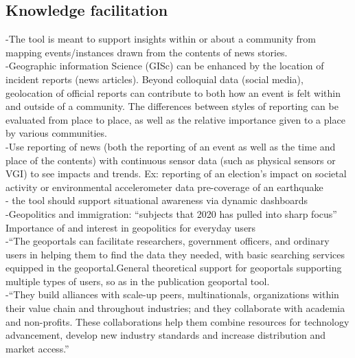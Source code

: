\subsection{Knowledge facilitation}
-{\color{purple}The tool is meant to support insights within or about a community from mapping events/instances drawn from the contents of news stories.\cite{McQueenBaker2019}}\\
-{\color{purple}Geographic information Science (GISc) can be enhanced by the location of incident reports (news articles).  Beyond colloquial data (social media), geolocation of official reports can contribute to both how an event is felt within and outside of a community. The differences between styles of reporting can be evaluated from place to place, as well as the relative importance given to a place by various communities.\cite{Datta2018}}\\
-{\color{purple}Use reporting of news (both the reporting of an event as well as the time and place of the contents) with continuous sensor data (such as physical sensors or VGI) to see impacts and trends. Ex: reporting of an election’s impact on societal activity or environmental accelerometer data pre-coverage of an earthquake}\cite{Bhattacharya2018}\\
-{\color{purple} the tool should support situational awareness via dynamic dashboards \cite{Varanda2020}}\\
-{\color{orange}Geopolitics and immigration: “subjects that 2020 has pulled into sharp focus” Importance of and interest in geopolitics for everyday users \cite{Granger2020a}}\\
-{\color{orange}“The geoportals can facilitate researchers, government officers, and ordinary users in helping them to find the data they needed, with basic searching services equipped in the geoportal.\cite{Jian2020}}{\color{purple}General theoretical support for geoportals supporting multiple types of users, so as in the publication geoportal tool.\cite{Jiang2020}}\\%
-{\color{orange}“They build alliances with scale-up peers, multinationals, organizations within their value chain and throughout industries; and they collaborate with academia and non-profits. These collaborations help them combine resources for technology advancement, develop new industry standards and increase distribution and market access.”}\\


